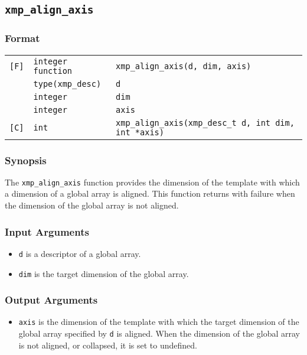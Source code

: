 \subsection{\tt xmp\_align\_axis}

\subsubsection*{Format}

\begin{tabular}{lll}

\verb![F]!& {\tt integer function}& {\tt xmp\_align\_axis(d, dim, axis)}\\
          & {\tt type(xmp\_desc)} & {\tt d}\\
          & {\tt integer} & {\tt dim}\\
          & {\tt integer} & {\tt axis}\\

\verb![C]!&  {\tt int}& {\tt xmp\_align\_axis(xmp\_desc\_t d, int dim, int *axis)}\\

\end{tabular}

\subsubsection*{Synopsis}

The {\tt xmp\_align\_axis} function provides the dimension of the
template with which a dimension of a global array is aligned. This
function returns with failure when the dimension of the global array is
not aligned.

\subsubsection*{Input Arguments}
\begin{itemize}
 \item {\tt d} is a descriptor of a global array.
 \item {\tt dim} is the target dimension of the global array.
\end{itemize}

\subsubsection*{Output Arguments}
\begin{itemize}
 \item {\tt axis} is the dimension of the template with which the target
       dimension of the global array specified by {\tt d} is
       aligned. When the dimension of the global array is not aligned,
       or collapsed, it is set to undefined.
\end{itemize}


